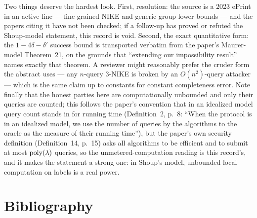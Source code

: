 \documentclass{aicr-conjecture}
\begin{document}
\begin{remark}\label{rem:caveats}
Two things deserve the hardest look. First, resolution: the source is a
2023 ePrint in an active line --- fine-grained NIKE and generic-group
lower bounds --- and the papers citing it have not been checked; if a
follow-up has proved or refuted the Shoup-model statement, this record
is void. Second, the exact quantitative form: the
$1 - 4\delta - \delta'$ success bound is transported verbatim from the
paper's Maurer-model Theorem~21, on the grounds that ``extending our
impossibility result'' names exactly that theorem. A reviewer might
reasonably prefer the cruder form the abstract uses --- any $n$-query
3-NIKE is broken by an $O(n^{2})$-query attacker --- which is the same
claim up to constants for constant completeness error. Note finally that
the honest parties here are computationally unbounded and only their
queries are counted; this follows the paper's convention that in an
idealized model query count stands in for running time
(Definition~2, p.~8: ``When the protocol is in an idealized model, we
use the number of queries by the algorithms to the oracle as the measure
of their running time''), but the paper's own security definition
(Definition~14, p.~15) asks all algorithms to be efficient and to submit
at most $\mathrm{poly}(\lambda)$ queries, so the unmetered-computation reading
is this record's, and it makes the statement a strong one: in Shoup's
model, unbounded local computation on labels is a real power.
\end{remark}

\section{Bibliography}
\end{document}
